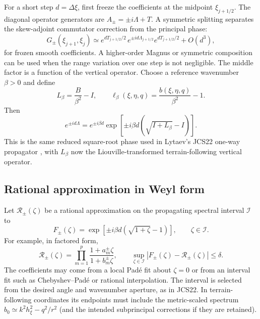 \documentclass[11pt]{article}
\begin{document}
For a short step $d=\Delta\xi$, first freeze the coefficients at the
midpoint $\xi_{j+1/2}$. The diagonal operator generators are
$A_\pm=\pm i\Lambda+T$. A symmetric splitting separates the skew-adjoint
commutator correction from the principal phase:
\begin{equation}\label{eq:splitstep}
  G_\pm(\xi_{j+1},\xi_j)\simeq
  e^{dT_{j+1/2}/2}\,e^{\pm id\Lambda_{j+1/2}}
  e^{dT_{j+1/2}/2}+O(d^3),
\end{equation}
for frozen smooth coefficients. A higher-order Magnus or symmetric
composition can be used when the range variation over one step is not
negligible. The middle factor is a function of the vertical operator. Choose
a reference wavenumber $\beta>0$ and define
\begin{equation}\label{eq:Lop}
  L_\beta=\frac{B}{\beta^2}-I,
  \qquad \ell_\beta(\xi,\eta,q)=\frac{b(\xi,\eta,q)}{\beta^2}-1.
\end{equation}
Then
\begin{equation}\label{eq:phasefunction}
  e^{\pm id\Lambda}=e^{\pm i\beta d}
  \exp\!\left[\pm i\beta d\left(\sqrt{I+L_\beta}-I\right)\right].
\end{equation}
This is the same reduced square-root phase used in Lytaev's JCS22 one-way
propagator \cite{lytaev_jcs}, with $L_\beta$ now the Liouville-transformed
terrain-following vertical operator.

\subsection{Rational approximation in Weyl form}

Let $\mathscr R_\pm(\zeta)$ be a rational approximation on the propagating
spectral interval $\mathcal I$ to
\begin{equation}\label{eq:targetscalar}
  F_\pm(\zeta)=
  \exp\!\left[\pm i\beta d\left(\sqrt{1+\zeta}-1\right)\right],
  \qquad \zeta\in\mathcal I.
\end{equation}
For example, in factored form,
\begin{equation}\label{eq:rational}
  \mathscr R_\pm(\zeta)=
  \prod_{m=1}^{p}\frac{1+a_m^\pm\zeta}{1+b_m^\pm\zeta},
  \qquad
  \sup_{\zeta\in\mathcal I}|F_\pm(\zeta)-\mathscr R_\pm(\zeta)|\le\delta.
\end{equation}
The coefficients may come from a local Pad\'e fit about $\zeta=0$ or from
an interval fit such as Chebyshev--Pad\'e or rational interpolation. The
interval is selected from the desired angle and wavenumber aperture, as in
JCS22. In terrain-following coordinates its endpoints must include the
metric-scaled spectrum $b_0\simeq k^2h_\xi^2-q^2/r^2$ (and the intended
subprincipal corrections if they are retained).
\end{document}
